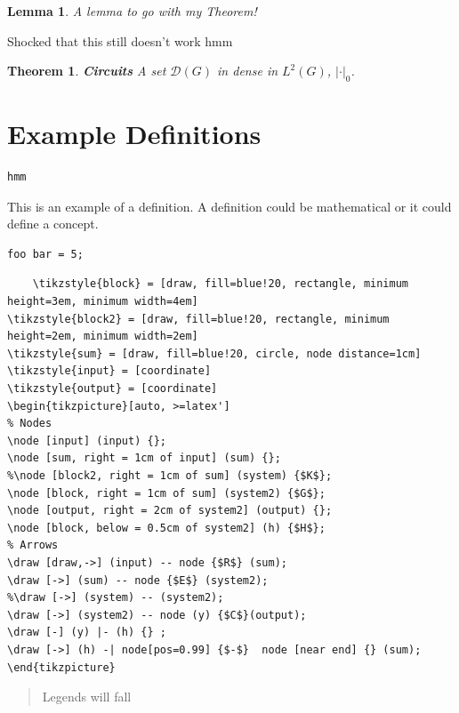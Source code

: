 \documentclass{scrreprt}
\theoremstyle{plain}
\newtheorem{theorem}{Theorem}[section]
\newtheorem{lemma}{Lemma}[theorem]
\theoremstyle{definition}
\theoremstyle{remark}
\begin{document}
\begin{lemma}
	A lemma to go with my Theorem!
\end{lemma}
Shocked that this still doesn't work hmm


\begin{theorem}{\textbf{Circuits}}
	A set $\mathcal{D}(G)$ in dense in $L^2(G)$, $|\cdot|_0$. 
\end{theorem}
\section{Example Definitions}

\begin{lstlisting}[caption={This is a caption}]
hmm
\end{lstlisting}
This is an example of a definition. A definition could be mathematical or it could define a concept.
\begin{lstlisting}[caption={This is a caption}]
foo bar = 5;
\end{lstlisting}


\begin{verbatim}
	\tikzstyle{block} = [draw, fill=blue!20, rectangle, minimum height=3em, minimum width=4em]
\tikzstyle{block2} = [draw, fill=blue!20, rectangle, minimum height=2em, minimum width=2em]
\tikzstyle{sum} = [draw, fill=blue!20, circle, node distance=1cm]
\tikzstyle{input} = [coordinate]
\tikzstyle{output} = [coordinate]
\begin{tikzpicture}[auto, >=latex']
% Nodes
\node [input] (input) {};
\node [sum, right = 1cm of input] (sum) {};
%\node [block2, right = 1cm of sum] (system) {$K$};
\node [block, right = 1cm of sum] (system2) {$G$};
\node [output, right = 2cm of system2] (output) {};
\node [block, below = 0.5cm of system2] (h) {$H$};
% Arrows
\draw [draw,->] (input) -- node {$R$} (sum);
\draw [->] (sum) -- node {$E$} (system2);
%\draw [->] (system) -- (system2);
\draw [->] (system2) -- node (y) {$C$}(output);
\draw [-] (y) |- (h) {} ;
\draw [->] (h) -| node[pos=0.99] {$-$}  node [near end] {} (sum);
\end{tikzpicture} 
\end{verbatim}


%
\begin{quote}
	Legends will fall
\end{quote}
\end{document}
